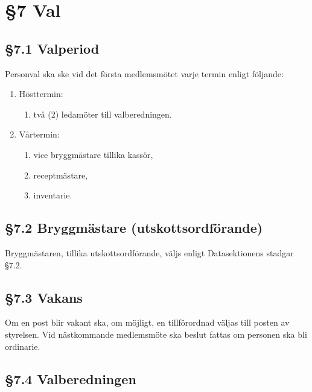 \section*{\S7 Val}

\subsection*{\S7.1 Valperiod}
{}

Personval ska ske vid det första medlemsmötet varje termin enligt följande:
\begin{enumerate}[label=\alph*)]
	\item Hösttermin:
	\begin{enumerate}[label=\roman*)]
		\item två (2) ledamöter till valberedningen.
	\end{enumerate}
	\item Vårtermin:
	\begin{enumerate}[label=\roman*)]
		\item vice bryggmästare tillika kassör,
		\item receptmästare,
		\item inventarie.
	\end{enumerate}
\end{enumerate}

\subsection*{\S7.2 Bryggmästare (utskottsordförande)}

Bryggmästaren, tillika utskottsordförande, väljs enligt Datasektionens stadgar
\S7.2.

\subsection*{\S7.3 Vakans}

Om en post blir vakant ska, om möjligt, en tillförordnad väljas till posten av
styrelsen. Vid nästkommande medlemsmöte ska beslut fattas om personen ska bli
ordinarie.

\subsection*{\S7.4 Valberedningen}

